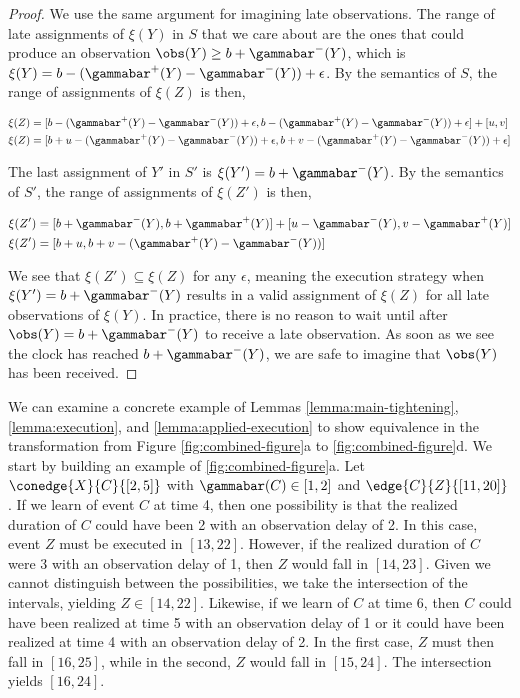 \documentclass[11pt]{article}
\begin{document}
\begin{proof}
We use the same argument for imagining late observations. The range of late assignments of \(\xi(Y)\)
in \(S\) that we care about are the ones that could produce an observation \(\obs(Y) \geq b +
\gammabar^-(Y)\), which is \(\xi(Y) = b - (\gammabar^+(Y) - \gammabar^-(Y)) + \epsilon\). By the
semantics of \(S\), the range of assignments of \(\xi(Z)\) is then,

\begin{align*}
\xi(Z) &= [b - (\gammabar^+(Y) - \gammabar^-(Y)) + \epsilon, b - (\gammabar^+(Y) - \gammabar^-(Y)) + \epsilon] + [u, v] \\
\xi(Z) &= [b + u - (\gammabar^+(Y) - \gammabar^-(Y)) + \epsilon, b + v - (\gammabar^+(Y) - \gammabar^-(Y)) + \epsilon]
\end{align*}

The last assignment of \(Y'\) in \(S'\) is \(\xi(Y') = b + \gammabar^-(Y)\). By the semantics of \(S'\),
the range of assignments of \(\xi(Z')\) is then,

\begin{align*}
\xi(Z') &= [b + \gammabar^-(Y), b + \gammabar^+(Y)] + [u - \gammabar^-(Y), v - \gammabar^+(Y)] \\
\xi(Z') &= [b + u, b + v - (\gammabar^+(Y) - \gammabar^-(Y))]
\end{align*}

We see that \(\xi(Z') \subseteq \xi(Z)\) for any \(\epsilon\), meaning the execution strategy when
\(\xi(Y') = b + \gammabar^-(Y)\) results in a valid assignment of \(\xi(Z)\) for all late observations
of \(\xi(Y)\). In practice, there is no reason to wait until after \(\obs(Y) = b + \gammabar^-(Y)\) to
receive a late observation. As soon as we see the clock has reached \(b + \gammabar^-(Y)\), we are
safe to imagine that \(\obs(Y)\) has been received.
\end{proof}

We can examine a concrete example of Lemmas \ref{lemma:main-tightening}, \ref{lemma:execution}, and
\ref{lemma:applied-execution} to show equivalence in the transformation from Figure
\ref{fig:combined-figure}a to \ref{fig:combined-figure}d. We start by building an example of
\ref{fig:combined-figure}a. Let \(\conedge{X}{C}{[2, 5]}\) with \(\gammabar(C) \in [1, 2]\) and
\(\edge{C}{Z}{[11, 20]}\). If we learn of event \(C\) at time 4, then one possibility is that the
realized duration of \(C\) could have been 2 with an observation delay of 2. In this case, event \(Z\)
must be executed in \([13, 22]\). However, if the realized duration of \(C\) were 3 with an observation
delay of 1, then \(Z\) would fall in \([14, 23]\). Given we cannot distinguish between the
possibilities, we take the intersection of the intervals, yielding \(Z \in [14, 22]\). Likewise, if we
learn of \(C\) at time 6, then \(C\) could have been realized at time 5 with an observation delay of 1
or it could have been realized at time 4 with an observation delay of 2. In the first case, \(Z\) must
then fall in \([16, 25]\), while in the second, \(Z\) would fall in \([15, 24]\). The intersection yields
\([16, 24]\).
\end{document}
